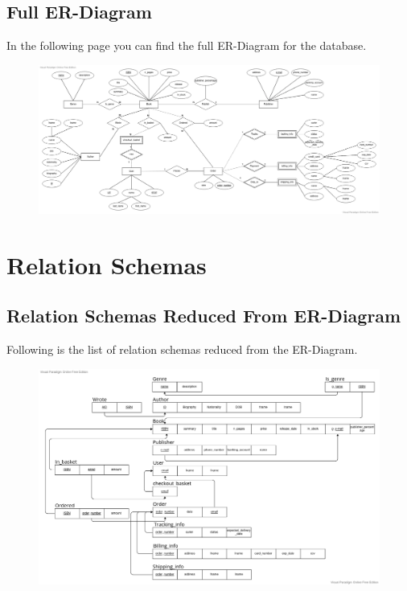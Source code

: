 \documentclass[fleqn]{scrreprt}
\begin{document}
\section{Full ER-Diagram}
In the following page you can find the full ER-Diagram for the database.
\begin{figure}\centering
    \includegraphics[width=\columnwidth]{er-diagram-project.vpd.png}
    \label{fig:erfull}
\end{figure}

\chapter{Relation Schemas}
\section{Relation Schemas Reduced From ER-Diagram}
Following is the list of relation schemas reduced from the ER-Diagram.
\begin{figure}[h]\centering
    \includegraphics[width=\columnwidth]{relational-schema.vpd.png}
    \label{fig:rs}
\end{figure}
\end{document}
